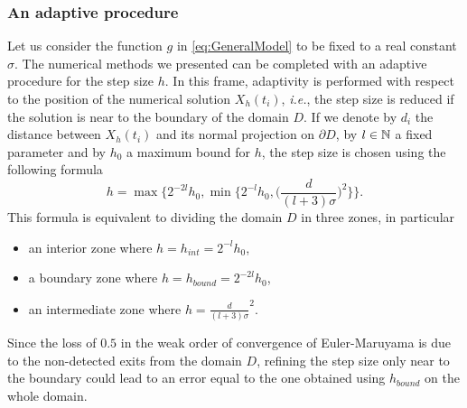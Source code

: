 \subsubsection{An adaptive procedure}\label{sec:Adapt}

Let us consider the function $g$ in \eqref{eq:GeneralModel} to be fixed to a real constant $\sigma$. The numerical methods we presented can be completed with an adaptive procedure for the step size $h$. In this frame, adaptivity is performed with respect to the position of the numerical solution $X_h(t_i)$, \textit{i.e.}, the step size is reduced if the solution is near to the boundary of the domain $D$. If we denote by $d_i$ the distance between $X_h(t_i)$ and its normal projection on $\partial D$, by $l \in \mathbb{N}$ a fixed parameter and by $h_0$ a maximum bound for $h$, the step size is chosen using the following formula
\begin{equation}\label{eq:Adaptivity}
	h = \max\Big\{ 2^{-2l}h_0, \min\Big\{ 2^{-l}h_0, \Big(\frac{d}{(l + 3)\sigma}\Big)^2\Big\}\Big\}.
\end{equation}
This formula is equivalent to dividing the domain $D$ in three zones, in particular
\begin{itemize}
	\item an interior zone where $h = h_{int} = 2^{-l}h_0$,
	\item a boundary zone where $h = h_{bound} = 2^{-2l}h_0$,
	\item an intermediate zone where $h = \frac{d}{(l + 3)\sigma}^2$.
\end{itemize}
Since the loss of $0.5$ in the weak order of convergence of Euler-Maruyama is due to the non-detected exits from the domain $D$, refining the step size only near to the boundary could lead to an error equal to the one obtained using $h_{bound}$ on the whole domain.
